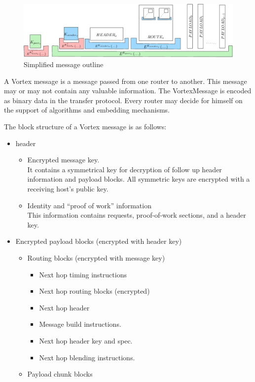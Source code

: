 \begin{figure}[ht]
	\includegraphics[width=\textwidth]{inc/blockLayoutSimplified}
	\caption{Simplified message outline}
	\label{fig:messageOutline}
\end{figure}

A Vortex message is a message passed from one router to another. This message may or may not contain any valuable information. The VortexMessage is encoded as binary data in the transfer protocol. Every router may decide for himself on the support of algorithms and embedding mechanisms.

The block structure of a Vortex message is as follows:
\begin{itemize}
	\item header
	\begin{itemize}
		\item Encrypted message key.\\
		It contains a symmetrical key for decryption of follow up header information and payload blocks. All symmetric keys are encrypted with a receiving host's public key.
		\item Identity and ``proof of work'' information\\
		This information contains requests, proof-of-work sections, and a header key.
	\end{itemize}
	\item Encrypted payload blocks (encrypted with header key)
	\begin{itemize}
		\item Routing blocks (encrypted with message key)
		\begin{itemize}
			\item Next hop timing instructions
			\item Next hop routing blocks (encrypted)
			\item Next hop header
			\item Message build instructions.
			\item Next hop header key and spec.
			\item Next hop blending instructions.
		\end{itemize}
		\item Payload chunk blocks
	\end{itemize}
\end{itemize}

